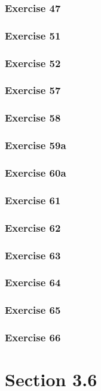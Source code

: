 \documentclass[letterpaper, 12pt]{math}
\begin{document}
\subsubsection*{Exercise 47}
\subsubsection*{Exercise 51}
\subsubsection*{Exercise 52}
\subsubsection*{Exercise 57}
\subsubsection*{Exercise 58}
\subsubsection*{Exercise 59a}
\subsubsection*{Exercise 60a}
\subsubsection*{Exercise 61}
\subsubsection*{Exercise 62}
\subsubsection*{Exercise 63}
\subsubsection*{Exercise 64}
\subsubsection*{Exercise 65}
\subsubsection*{Exercise 66}

\section*{Section 3.6}
\end{document}
